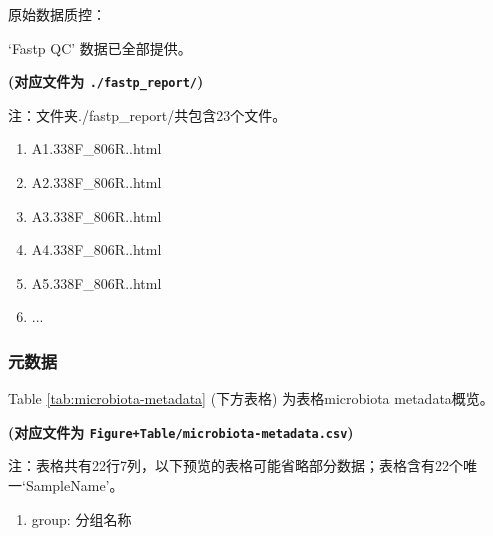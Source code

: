 \documentclass[
]{article}
\providecommand{\tightlist}{%
  \setlength{\itemsep}{0pt}\setlength{\parskip}{0pt}}
\begin{document}
原始数据质控：

`Fastp QC' 数据已全部提供。

\textbf{(对应文件为 \texttt{./fastp\_report/})}

\begin{center}\begin{tcolorbox}[colback=gray!10, colframe=gray!50, width=0.9\linewidth, arc=1mm, boxrule=0.5pt]注：文件夹./fastp\_report/共包含23个文件。

\begin{enumerate}\tightlist
\item A1.338F\_806R..html
\item A2.338F\_806R..html
\item A3.338F\_806R..html
\item A4.338F\_806R..html
\item A5.338F\_806R..html
\item ...
\end{enumerate}\end{tcolorbox}
\end{center}

\hypertarget{ux5143ux6570ux636e}{%
\subsubsection{元数据}\label{ux5143ux6570ux636e}}

Table \ref{tab:microbiota-metadata} (下方表格) 为表格microbiota metadata概览。

\textbf{(对应文件为 \texttt{Figure+Table/microbiota-metadata.csv})}

\begin{center}\begin{tcolorbox}[colback=gray!10, colframe=gray!50, width=0.9\linewidth, arc=1mm, boxrule=0.5pt]注：表格共有22行7列，以下预览的表格可能省略部分数据；表格含有22个唯一`SampleName'。
\end{tcolorbox}
\end{center}
\begin{center}\begin{tcolorbox}[colback=gray!10, colframe=gray!50, width=0.9\linewidth, arc=1mm, boxrule=0.5pt]\begin{enumerate}\tightlist
\item group:  分组名称
\end{enumerate}\end{tcolorbox}
\end{center}
\end{document}
